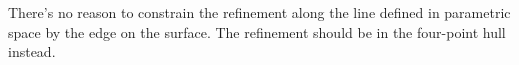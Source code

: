 There's no reason to constrain the refinement along the line defined in parametric space by the edge on the surface. The refinement should be in the four-point hull instead.
